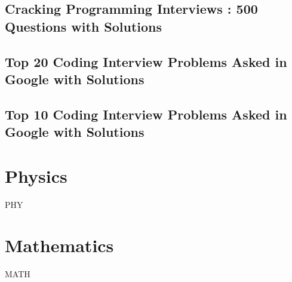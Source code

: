 \documentclass[makeidx, 12pt, oneside, onecolumn, openright, final, svgnames, dvipsnames, extrafontsizes]{memoir}
\theoremstyle{problemstyle}
\begin{document}
\chapter{Cracking Programming Interviews : 500 Questions with Solutions}

\chapter{Top 20 Coding Interview Problems Asked in Google with Solutions}

\chapter{Top 10 Coding Interview Problems Asked in Google with Solutions}



\part{Physics}
PHY

\part{Mathematics}
MATH
\end{document}
